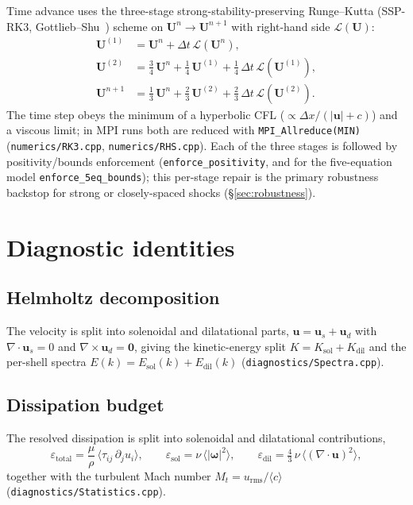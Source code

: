 \documentclass[11pt]{article}
\newcommand{\uvec}{\mathbf{u}}
\newcommand{\code}[1]{\texttt{#1}}
\begin{document}
Time advance uses the three-stage strong-stability-preserving Runge--Kutta
(SSP-RK3, Gottlieb--Shu~\cite{gottlieb_shu_1998}) scheme on $\mathbf{U}^n \to \mathbf{U}^{n+1}$ with
right-hand side $\mathcal{L}(\mathbf{U})$:
\begin{align}
\mathbf{U}^{(1)} &= \mathbf{U}^n + \Delta t\,\mathcal{L}(\mathbf{U}^n),\\
\mathbf{U}^{(2)} &= \tfrac34\,\mathbf{U}^n + \tfrac14\,\mathbf{U}^{(1)}
                   + \tfrac14\,\Delta t\,\mathcal{L}(\mathbf{U}^{(1)}),\\
\mathbf{U}^{n+1} &= \tfrac13\,\mathbf{U}^n + \tfrac23\,\mathbf{U}^{(2)}
                   + \tfrac23\,\Delta t\,\mathcal{L}(\mathbf{U}^{(2)}).
\end{align}
The time step obeys the minimum of a hyperbolic CFL ($\propto \Delta x/(|\uvec|+c)$)
and a viscous limit; in MPI runs both are reduced with \code{MPI\_Allreduce(MIN)}
(\code{numerics/RK3.cpp}, \code{numerics/RHS.cpp}). Each of the three stages is
followed by positivity/bounds enforcement (\code{enforce\_positivity}, and for the
five-equation model \code{enforce\_5eq\_bounds}); this per-stage repair is the
primary robustness backstop for strong or closely-spaced shocks
(\S\ref{sec:robustness}).

\section{Diagnostic identities}
\label{sec:diag}

\subsection{Helmholtz decomposition}
The velocity is split into solenoidal and dilatational parts,
$\uvec = \uvec_s + \uvec_d$ with $\nabla\!\cdot\uvec_s = 0$ and
$\nabla\times\uvec_d = \mathbf{0}$, giving the kinetic-energy split
$K = K_{\mathrm{sol}} + K_{\mathrm{dil}}$ and the per-shell spectra
$E(k) = E_{\mathrm{sol}}(k) + E_{\mathrm{dil}}(k)$ (\code{diagnostics/Spectra.cpp}).

\subsection{Dissipation budget}
The resolved dissipation is split into solenoidal and dilatational contributions,
\begin{equation}
\varepsilon_{\text{total}} = \frac{\mu}{\rho}\,\big\langle \tau_{ij}\,\partial_j u_i\big\rangle,
\qquad
\varepsilon_{\mathrm{sol}} = \nu\,\langle|\boldsymbol{\omega}|^2\rangle,
\qquad
\varepsilon_{\mathrm{dil}} = \tfrac43\,\nu\,\langle(\nabla\!\cdot\uvec)^2\rangle,
\end{equation}
together with the turbulent Mach number $M_t = u_{\text{rms}}/\langle c\rangle$
(\code{diagnostics/Statistics.cpp}).
\end{document}
